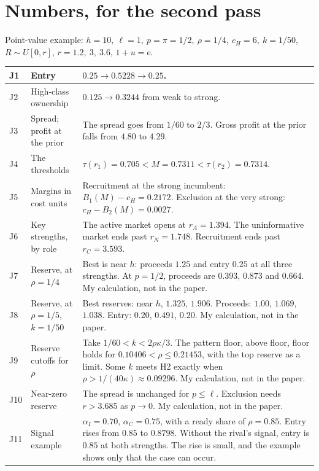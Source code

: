 \documentclass[10.5pt]{article}
\makeatletter
\newenvironment{cards}{\begin{longtable}{@{}IQA@{}}}{\end{longtable}}
\newcommand{\card}[3]{#1 & #2 & #3\\\midrule}
\newcommand{\mine}{{\sffamily\footnotesize\color{ox}My calculation, not in the paper.}\ }
\makeatother
\begin{document}
\section{Numbers, for the second pass}
Point-value example: $h=10,\ \ell=1,\ p=\pi=1/2,\ \rho=1/4,\ c_H=6,\ k=1/50$, $R\sim U[0,r]$, $r=1.2,\ 3,\ 3.6$, $1+u=\mathrm{e}$.
\begin{cards}
\card{J1}{Entry}{$0.25\to0.5228\to0.25$.}
\card{J2}{High-class ownership}{$0.125\to0.3244$ from weak to strong.}
\card{J3}{Spread; profit at the prior}{The spread goes from $1/60$ to $2/3$. Gross profit at the prior falls from $4.80$ to $4.29$.}
\card{J4}{The thresholds}{$\tau(r_1)=0.705<M=0.7311<\tau(r_2)=0.7314$.}
\card{J5}{Margins in cost units}{Recruitment at the strong incumbent: $B_1(M)-c_H=0.2172$. Exclusion at the very strong: $c_H-B_2(M)=0.0027$.}
\card{J6}{Key strengths, by role}{The active market opens at $r_A=1.394$. The uninformative market ends past $r_N=1.748$. Recruitment ends past $r_C=3.593$.}
\card{J7}{Reserve, at $\rho=1/4$}{Best is near $h$: proceeds $1.25$ and entry $0.25$ at all three strengths. At $p=1/2$, proceeds are $0.393$, $0.873$ and $0.664$. \mine}
\card{J8}{Reserve, at $\rho=1/5$, $k=1/50$}{Best reserves: near $h$, $1.325$, $1.906$. Proceeds: $1.00$, $1.069$, $1.038$. Entry: $0.20$, $0.491$, $0.20$. \mine}
\card{J9}{Reserve cutoffs for $\rho$}{Take $1/60<k<2\rho\kappa/3$. The pattern floor, above floor, floor holds for $0.10406<\rho\le0.21453$, with the top reserve as a limit. Some $k$ meets H2 exactly when $\rho>1/(40\kappa)\approx0.09296$. \mine}
\card{J10}{Near-zero reserve}{The spread is unchanged for $p\le\ell$. Exclusion needs $r>3.685$ as $p\to0$. \mine}
\card{J11}{Signal example}{$\alpha_I=0.70$, $\alpha_C=0.75$, with a ready share of $\rho=0.85$. Entry rises from $0.85$ to $0.8798$. Without the rival's signal, entry is $0.85$ at both strengths. The rise is small, and the example shows only that the case can occur.}
\end{cards}
\end{document}
